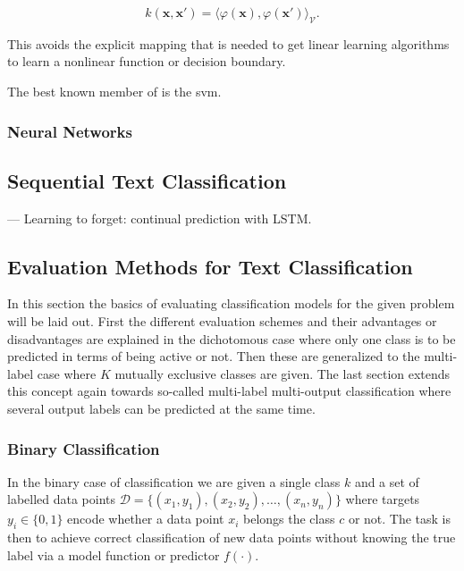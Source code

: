 \begin{equation}
  k(\mathbf {x} ,\mathbf {x'} )=\langle \varphi (\mathbf {x} ),\varphi (\mathbf {x'} )\rangle _{\mathcal {V}}.
\end{equation}

This avoids the explicit mapping that is needed to get linear learning algorithms to learn a nonlinear function or decision boundary.

The best known member of is the \gls{svm}.

\subsubsection{Neural Networks}
\label{subs:Neural Networks}

\subsection{Sequential Text Classification}
\label{sub:Sequential Modeling Approach}

\cite{Gers:1999aa} --- Learning to forget: continual prediction with LSTM.

\subsection{Evaluation Methods for Text Classification}
\label{sub:Evaluation Methods for Text Classification}

In this section the basics of evaluating classification models for the given problem will be laid out. First the different evaluation schemes and their advantages or disadvantages are explained in the dichotomous case where only one class is to be predicted in terms of being active or not. Then these are generalized to the multi-label case where $K$ mutually exclusive classes are given. The last section extends this concept again towards so-called multi-label multi-output classification where several output labels can be predicted at the same time.

\subsubsection{Binary Classification}
\label{subs:Binary Classification}

In the binary case of classification we are given a single class $k$ and a set of labelled data points $\mathcal{D} = \{ (x_1, y_1), (x_2, y_2), \ldots, (x_n, y_n) \}$ where targets $y_i \in \{0, 1\}$ encode whether a data point $x_i$ belongs the class $c$ or not. The task is then to achieve correct classification of new data points without knowing the true label via a model function or predictor $f(\cdot)$.


